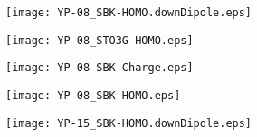 \begin{figure}[tb]
\texttt{[image: YP-08\_SBK-HOMO.downDipole.eps]}
\caption{\label{Fig:YP8_HOMO_alongdipole}}
\end{figure}

\begin{figure}[tb]
\texttt{[image: YP-08\_STO3G-HOMO.eps]}
\caption{\label{Fig:YP8_HOMO_alongdipole}}
\end{figure}



\begin{figure}[tb]
\texttt{[image: YP-08-SBK-Charge.eps]}
\caption{\label{Fig:YP8_HOMO_alongdipole}}
\end{figure}

\begin{figure}[tb]
\texttt{[image: YP-08\_SBK-HOMO.eps]}
\caption{\label{Fig:YP8_HOMO_alongdipole}}
\end{figure}


\begin{figure}[tb]
\texttt{[image: YP-15\_SBK-HOMO.downDipole.eps]}
\caption{\label{Fig:YP8_HOMO_alongdipole}}
\end{figure}

